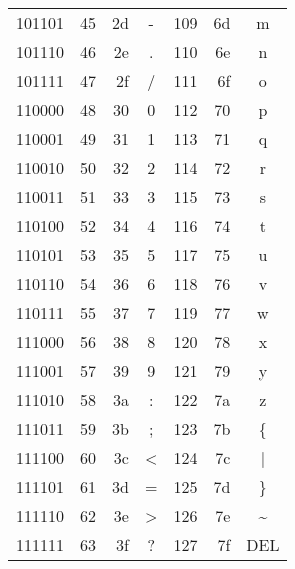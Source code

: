 \begin{tabular*}{\linewidth}{@{\extracolsep{\fill}}CRRC|RRC}
    101101 & 45  & 2d  & -     & 109 & 6d  & m                \\
    101110 & 46  & 2e  & .     & 110 & 6e  & n                \\
    101111 & 47  & 2f  & /     & 111 & 6f  & o                \\
    110000 & 48  & 30  & 0     & 112 & 70  & p                \\
    110001 & 49  & 31  & 1     & 113 & 71  & q                \\
    110010 & 50  & 32  & 2     & 114 & 72  & r                \\
    110011 & 51  & 33  & 3     & 115 & 73  & s                \\
    110100 & 52  & 34  & 4     & 116 & 74  & t                \\
    110101 & 53  & 35  & 5     & 117 & 75  & u                \\
    110110 & 54  & 36  & 6     & 118 & 76  & v                \\
    110111 & 55  & 37  & 7     & 119 & 77  & w                \\
    111000 & 56  & 38  & 8     & 120 & 78  & x                \\
    111001 & 57  & 39  & 9     & 121 & 79  & y                \\
    111010 & 58  & 3a  & :     & 122 & 7a  & z                \\
    111011 & 59  & 3b  & ;     & 123 & 7b  & \{               \\
    111100 & 60  & 3c  & <     & 124 & 7c  & |                \\
    111101 & 61  & 3d  & =     & 125 & 7d  & \}               \\
    111110 & 62  & 3e  & >     & 126 & 7e  & \textasciitilde  \\
    111111 & 63  & 3f  & ?     & 127 & 7f  & DEL              \\
    \bottomrule
\end{tabular*}
